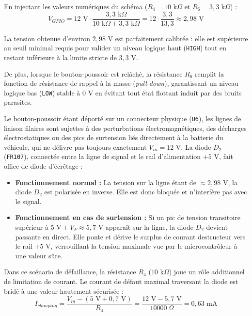 En injectant les valeurs numériques du schéma ($R_4 = 10\text{ k}\Omega$ et $R_6 = 3{,}3\text{ k}\Omega$) :
\begin{equation}
    V_{GPIO} = 12\text{ V} \cdot \frac{3{,}3\text{ k}\Omega}{10\text{ k}\Omega + 3{,}3\text{ k}\Omega} = 12 \cdot \frac{3{,}3}{13{,}3} \approx 2{,}98\text{ V}
\end{equation}

La tension obtenue d'environ $2{,}98\text{ V}$ est parfaitement calibrée : 
elle est supérieure au seuil minimal requis pour valider un niveau logique haut (\texttt{HIGH}) 
tout en restant inférieure à la limite stricte de $3{,}3\text{ V}$. 

De plus, lorsque le bouton-poussoir est relâché, la résistance $R_6$ remplit la fonction de résistance de rappel
à la masse (\textit{pull-down}), garantissant un niveau logique bas (\texttt{LOW}) stable à $0\text{ V}$ en 
évitant tout état flottant induit par des bruits parasites.

\bigskip
Le bouton-poussoir étant déporté sur un connecteur physique (\texttt{U6}), les lignes de liaison filaires sont sujettes à des perturbations électromagnétiques, 
des décharges électrostatiques ou des pics de surtension liés directement à la batterie du véhicule, qui ne délivre pas toujours exactement $V_{in} = 12\text{ V}$.
La diode $D_2$ (\texttt{FR107}), connectée entre la ligne de signal et le rail d'alimentation $+5\text{ V}$, fait office de diode d'écrêtage :

\begin{itemize}
    \item \textbf{Fonctionnement normal :} La tension sur la ligne étant de $\approx 2{,}98\text{ V}$, la diode $D_2$ est polarisée en inverse. Elle est donc bloquée et n'interfère pas avec le signal.
    \item \textbf{Fonctionnement en cas de surtension :} Si un pic de tension transitoire supérieur à $5\text{ V} + V_F \approx 5{,}7\text{ V}$ apparaît sur la ligne, la diode $D_2$ devient passante en direct. Elle ponte et dérive le surplus de courant destructeur vers le rail $+5\text{ V}$, verrouillant la tension maximale vue par le microcontrôleur à une valeur sûre.
\end{itemize}

Dans ce scénario de défaillance, la résistance $R_4$ ($10\text{ k}\Omega$) joue un rôle additionnel de limitation de courant. 
Le courant de défaut maximal traversant la diode est bridé à une valeur hautement sécurisée :
\begin{equation}
    I_{clamping} = \frac{V_{in} - (5\text{ V} + 0{,}7\text{ V})}{R_4} = \frac{12\text{ V} - 5{,}7\text{ V}}{10000\ \Omega} = 0{,}63\text{ mA}
\end{equation}

